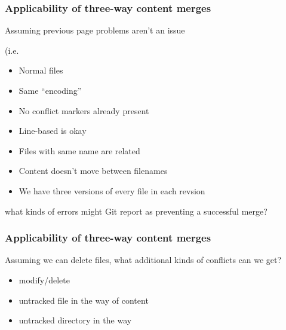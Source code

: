 \documentclass[t]{beamer}
\begin{document}
\begin{frame}
  \frametitle{Applicability of three-way content merges}

  Assuming previous page problems aren't an issue {\scriptsize (i.e.\
  \begin{itemize}
    \item Normal files
    \item Same ``encoding''
    \item No conflict markers already present
    \item Line-based is okay
    \item Files with same name are related
    \item Content doesn't move between filenames
    \item We have three versions of every file in each revsion
  \end{itemize}
  } what kinds of errors might Git report as preventing a
  successful merge?


\end{frame}


\begin{frame}
  \frametitle{Applicability of three-way content merges}

  Assuming we can delete files, what additional kinds of conflicts can we get?
  \pause
  \begin{itemize}
    \item modify/delete
    \pause
    \item untracked file in the way of content
    \pause
    \item untracked directory in the way
  \end{itemize}

\end{frame}
\end{document}
